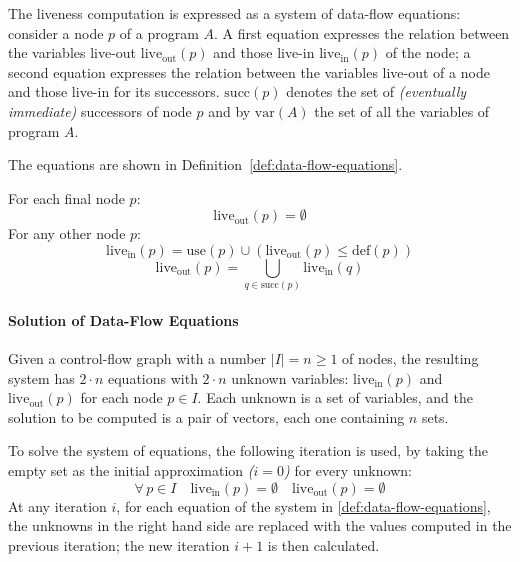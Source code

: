 \documentclass[english]{article}
\begin{document}
The liveness computation is expressed as a system of data-flow equations:
consider a node \(p\) of a program \(A\).
A first equation expresses the relation between the variables live-out \(\text{live}_\text{out}\left( p \right)\) and those live-in \(\text{live}_\text{in}\left( p \right)\) of the node;
a second equation expresses the relation between the variables live-out of a node and those live-in for its successors.
\(\text{succ}\left( p \right)\) denotes the set of \textit{(eventually immediate)} successors of node \(p\) and by \(\text{var}(A)\) the set of all the variables of program \(A\).

The equations are shown in Definition~\ref{def:data-flow-equations}.

\begin{definition}
  \label{def:data-flow-equations}
  For each final node \(p\):
  \[ \text{live}_\text{out}\left( p \right) = \emptyset \]
  For any other node \(p\):
  \[ \text{live}_\text{in}\left( p \right) = \text{use}\left( p \right) \cup \left( \text{live}_\text{out} \left( p \right) \leq \text{def}\left( p \right) \right) \]
  \[ \text{live}_\text{out}\left( p \right) = \bigcup_{q \in \text{succ}\left( p \right)} \text{live}_\text{in}\left( q \right) \]
\end{definition}

\paragraph{Solution of Data-Flow Equations}

Given a control-flow graph with a number \(|I| = n \geq 1\) of nodes, the resulting system has \(2 \cdot n\) equations with \(2 \cdot n\) unknown variables: \(\text{live}_\text{in}\left( p \right)\) and \(\text{live}_\text{out}\left( p \right)\) for each node \(p \in I\).
Each unknown is a set of variables, and the solution to be computed is a pair of vectors, each one containing \(n\) sets.

To solve the system of equations, the following iteration is used, by taking the empty set as the initial approximation \textit{(\(i=0\))} for every unknown:
\[ \forall \, p \in I \quad \text{live}_\text{in}\left( p \right) = \emptyset \quad \text{live}_\text{out} \left( p \right) = \emptyset \]
At any iteration \(i\), for each equation of the system in \ref{def:data-flow-equations}, the unknowns in the right hand side are replaced with the values computed in the previous iteration;
the new iteration \(i + 1\) is then calculated.
\end{document}
